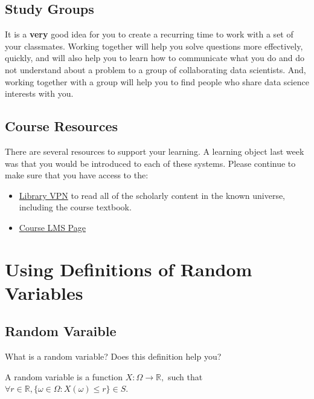 \documentclass[
  letterpaper,
  DIV=11,
  numbers=noendperiod]{scrreprt}
\providecommand{\tightlist}{%
  \setlength{\itemsep}{0pt}\setlength{\parskip}{0pt}}\usepackage{longtable,booktabs,array}
\begin{document}
\subsection*{Study Groups}\label{study-groups}

It is a \textbf{very} good idea for you to create a recurring time to
work with a set of your classmates. Working together will help you solve
questions more effectively, quickly, and will also help you to learn how
to communicate what you do and do not understand about a problem to a
group of collaborating data scientists. And, working together with a
group will help you to find people who share data science interests with
you.

\subsection*{Course Resources}\label{course-resources}

There are several resources to support your learning. A learning object
last week was that you would be introduced to each of these systems.
Please continue to make sure that you have access to the:

\begin{itemize}
\tightlist
\item
  \href{https://www.lib.berkeley.edu/using-the-libraries/vpn}{Library
  VPN} to read all of the scholarly content in the known universe,
  including the course textbook.
\item
  \href{https://www.bcourses.berkeley.edu}{Course LMS Page}
\end{itemize}

\section{Using Definitions of Random
Variables}\label{using-definitions-of-random-variables}

\subsection{Random Varaible}\label{random-varaible}

What is a random variable? Does this definition help you?

A random variable is a function \(X : \Omega \rightarrow \mathbb{R},\)
such that
\(\forall r \in \mathbb{R}, \{\omega \in \Omega: X(\omega) \leq r\} \in S\).
\end{document}

